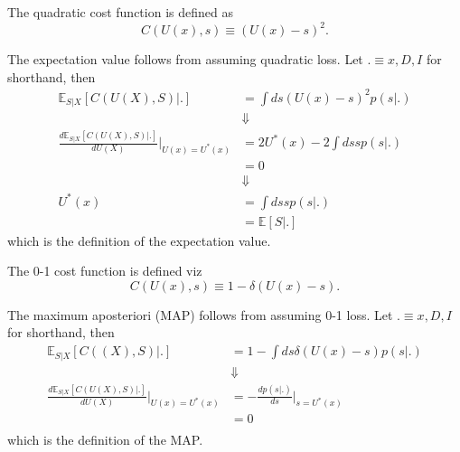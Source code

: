 	\begin{definition}
		\label{def:quadratic_cost}
		The quadratic cost function is defined as
		\begin{equation}
			C(U(x),s) \equiv (U(x)-s)^2.
		\end{equation}
	\end{definition}
	
	\begin{theorem}
		\label{theorem:expectation_cost}
		The expectation value follows from assuming quadratic loss. Let $.\equiv x,D,I$ for shorthand, then
		\begin{equation}
			\begin{split}
				\mathbb{E}_{S|X}[C(U(X), S)|.] &= \int ds (U(x)-s)^2 p(s|.)\\
				&\Downarrow\\
				\frac{d \mathbb{E}_{S|X}[C(U(X), S)|.]}{dU(X)}\bigg|_{U(x)=U^*(x)} &= 2U^*(x)-2\int ds sp(s|.)\\
				&=0\\
				&\Downarrow\\
				U^*(x)& = \int ds sp(s|.)\\
				&= \mathbb{E}[S|.]
			\end{split}
		\end{equation}
		which is the definition of the expectation value.
	\end{theorem}
	
	\begin{definition}
		\label{def:0_1_cost_function}
		The 0-1 cost function is defined viz
		\begin{equation}
			C(U(x),s) \equiv 1-\delta(U(x)-s).
		\end{equation}
	\end{definition}
	
	\begin{theorem}[MAP]
		\label{theorem:MAP}
		The maximum aposteriori (MAP) follows from assuming 0-1 loss. Let $.\equiv x,D,I$ for shorthand, then
		\begin{equation}
			\begin{split}
				\mathbb{E}_{S|X}[C((X), S)|.] &= 1-\int ds \delta(U(x)-s) p(s|.)\\
				&\Downarrow\\
				\frac{d \mathbb{E}_{S|X}[C(U(X), S)|.]}{dU(X)}\bigg|_{U(x)=U^*(x)} &= -\frac{dp(s|.)}{ds}\bigg|_{s=U^*(x)}\\
				&=0\\
			\end{split}
		\end{equation}
		which is the definition of the MAP.
	\end{theorem}
	
